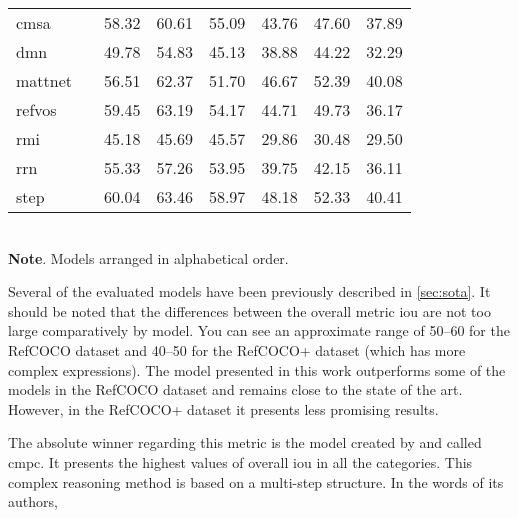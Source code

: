 \begin{table}[p]
\begin{tabular}{lc*6c}
    \acs{cmsa}      & \cite{ye21:refer_segmen_images_videos_cross}                 & 58.32          & 60.61          & 55.09          & 43.76          & 47.60          & 37.89          \\
    \acs{dmn}       & \cite{margffoy-tuay18:dynam_multim_instan_segmen}            & 49.78          & 54.83          & 45.13          & 38.88          & 44.22          & 32.29          \\
    \acs{mattnet}   & \cite{yu18:mattn}                                            & 56.51          & 62.37          & 51.70          & 46.67          & 52.39          & 40.08          \\
    \acs{refvos}    & \cite{bellver20:refvos}                                      & 59.45          & 63.19          & 54.17          & 44.71          & 49.73          & 36.17          \\
    \acs{rmi}       & \cite{liu17:recur_multim_inter_refer_image_segmen}           & 45.18          & 45.69          & 45.57          & 29.86          & 30.48          & 29.50          \\
    \acs{rrn}       & \cite{li18:refer_image_segmen_recur_refin_networ}            & 55.33          & 57.26          & 53.95          & 39.75          & 42.15          & 36.11          \\
    \acs{step}      & \cite{chen19:see_throug_text_group_refer_image_segmen}       & 60.04          & 63.46          & 58.97          & 48.18          & 52.33          & 40.41          \\
    \bottomrule
  \end{tabular}\\[1.25ex]
  {\small\textbf{Note}. Models arranged in alphabetical order.}
\end{table}

Several of the evaluated models have been previously described in
\vref{sec:sota}. It should be noted that the differences between the overall
metric \gls{iou} are not too large comparatively by model. You can see an
approximate range of 50--60 for the RefCOCO dataset and 40--50 for the RefCOCO+
dataset (which has more complex expressions). The model presented in this work
outperforms some of the models in the RefCOCO dataset and remains close to the
state of the art. However, in the RefCOCO+ dataset it presents less promising
results.

The absolute winner regarding this metric is the model created by
 and called
\gls{cmpc}. It presents the highest values of overall \gls{iou} in all the
categories. This complex reasoning method is based on a multi-step
structure. In the words of its authors,

